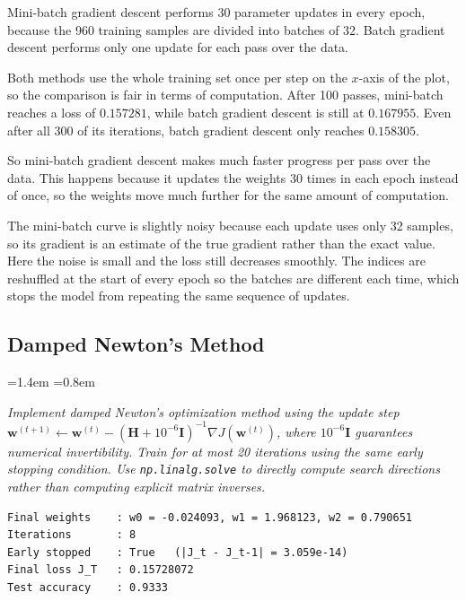 \documentclass[12pt,a4paper]{article}
\newcommand{\qtext}[1]{%
  \begin{list}{}{\leftmargin=1.4em \rightmargin=0.8em
                 \topsep=3pt \parsep=0pt \itemsep=0pt}
  \item[]\itshape #1
  \end{list}}
\begin{document}
Mini-batch gradient descent performs 30 parameter updates in every epoch, because the 960 training
samples are divided into batches of 32. Batch gradient descent performs only one update for each
pass over the data.

Both methods use the whole training set once per step on the $x$-axis of the plot, so the
comparison is fair in terms of computation. After 100 passes, mini-batch reaches a loss of
$0.157281$, while batch gradient descent is still at $0.167955$. Even after all 300 of its
iterations, batch gradient descent only reaches $0.158305$.

So mini-batch gradient descent makes much faster progress per pass over the data. This happens
because it updates the weights 30 times in each epoch instead of once, so the weights move much
further for the same amount of computation.

The mini-batch curve is slightly noisy because each update uses only 32 samples, so its gradient is
an estimate of the true gradient rather than the exact value. Here the noise is small and the loss
still decreases smoothly. The indices are reshuffled at the start of every epoch so the batches are
different each time, which stops the model from repeating the same sequence of updates.

\subsection{Damped Newton's Method}

\qtext{Implement damped Newton's optimization method using the update step
$\mathbf{w}^{(t+1)} \leftarrow \mathbf{w}^{(t)} -
(\mathbf{H} + 10^{-6}\mathbf{I})^{-1}\nabla J(\mathbf{w}^{(t)})$, where $10^{-6}\mathbf{I}$
guarantees numerical invertibility. Train for at most 20 iterations using the same early stopping
condition. Use \texttt{np.linalg.solve} to directly compute search directions rather than
computing explicit matrix inverses.}



\begin{lstlisting}[style=plainout]
Final weights    : w0 = -0.024093, w1 = 1.968123, w2 = 0.790651
Iterations       : 8
Early stopped    : True   (|J_t - J_t-1| = 3.059e-14)
Final loss J_T   : 0.15728072
Test accuracy    : 0.9333
\end{lstlisting}
\end{document}
